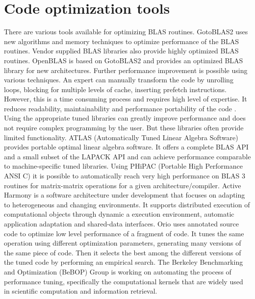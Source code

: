 \section{Code optimization tools}
There are various tools available for optimizing BLAS routines. GotoBLAS2 \cite{gotoblas2} uses new algorithms and memory techniques to optimize performance of the BLAS routines. Vendor supplied BLAS libraries \cite{amd,apple,intel,hp,sun,ibm} also provide highly optimized BLAS routines. OpenBLAS \cite{openblas} is based on GotoBLAS2 \cite{gotoblas2} and provides an optimized BLAS library for new architectures. Further performance improvement is possible using various techniques. An expert can manually transform the code by unrolling loops, blocking for multiple levels of cache, inserting prefetch instructions. However, this is a time consuming process and requires high level of expertise. It reduces readability, maintainability and performance portability of the code \cite{hoisie}. Using the appropriate tuned libraries can greatly improve performance and does not require complex programming by the user. But these libraries often provide limited functionality. ATLAS (Automatically Tuned Linear Algebra Software) \cite{whaley} provides portable optimal linear algebra software. It offers a complete BLAS API and a small subset of the LAPACK API and can achieve performance comparable to machine-specific tuned libraries. Using PHiPAC (Portable High Performance ANSI C) \cite{phipac} it is possible to automatically reach very high performance on BLAS 3 routines for matrix-matrix operations for a given architecture/compiler. Active Harmony \cite{activeharmony} is a software architecture under development that focuses on adapting to heterogeneous and changing environments. It supports distributed execution of computational objects through dynamic a execution environment, automatic application adaptation and shared-data interfaces. Orio \cite{orio} uses annotated source code to optimize low level performance of a fragment of code. It tunes the same operation using different optimization parameters, generating many versions of the same piece of code. Then it selects the best among the different versions of the tuned code by performing an empirical search. The Berkeley Benchmarking and Optimization (BeBOP) \cite{bebop} Group is working on automating the process of performance tuning, specifically the computational kernels that are widely used in scientific computation and information retrieval.

